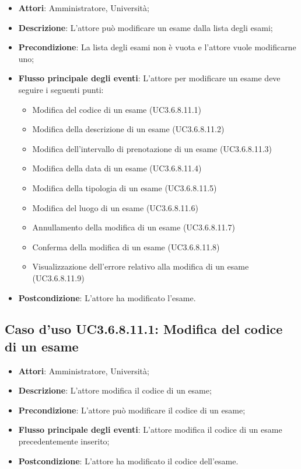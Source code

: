 \begin{itemize}
\item \textbf{Attori}: Amministratore, Università;
\item \textbf{Descrizione}: L'attore può modificare un esame dalla lista degli esami;

\item \textbf{Precondizione}: La lista degli esami non è vuota e l'attore vuole modificarne uno;

\item \textbf{Flusso principale degli eventi}: L'attore per modificare un esame deve seguire i seguenti punti:

\begin{itemize}
\item Modifica del codice di un esame (UC3.6.8.11.1)
\item Modifica della descrizione di un esame (UC3.6.8.11.2)
\item Modifica dell’intervallo di prenotazione di un esame (UC3.6.8.11.3)
\item Modifica della data di un esame (UC3.6.8.11.4)
\item Modifica della tipologia di un esame (UC3.6.8.11.5)
\item Modifica del luogo di un esame (UC3.6.8.11.6)
\item Annullamento della modifica di un esame (UC3.6.8.11.7)
\item Conferma della modifica di un esame (UC3.6.8.11.8)
\item Visualizzazione dell'errore relativo alla modifica di un esame (UC3.6.8.11.9)
\end{itemize}
\item \textbf{Postcondizione}: L'attore ha modificato l'esame.

\end{itemize}
\subsection{Caso d'uso \texorpdfstring{UC3.6.8.11.1}{UC3.6.8.11.1}: Modifica del codice di un esame}
\begin{itemize}
\item \textbf{Attori}: Amministratore, Università;
\item \textbf{Descrizione}: L'attore modifica il codice di un esame;

\item \textbf{Precondizione}: L'attore può modificare il codice di un esame;

\item \textbf{Flusso principale degli eventi}: L'attore modifica il codice di un esame precedentemente inserito;

\item \textbf{Postcondizione}: L'attore ha modificato il codice dell’esame.

\end{itemize}
